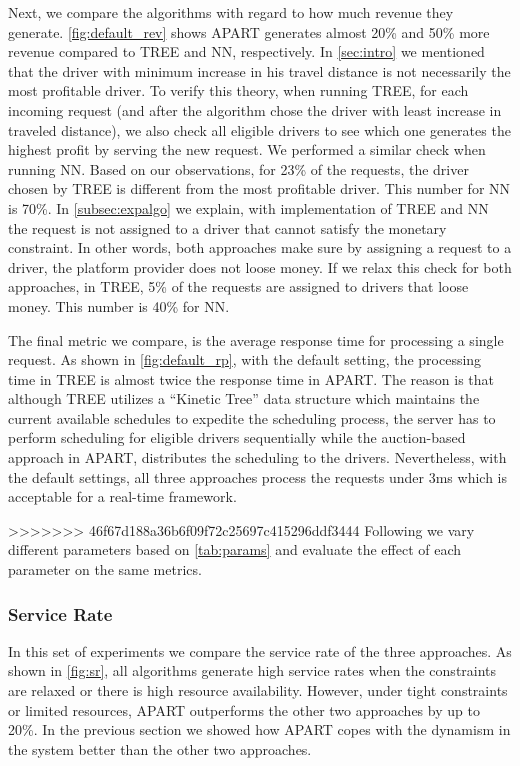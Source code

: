 Next, we compare the algorithms with regard to how much revenue they generate. \cref{fig:default_rev} shows APART generates almost 20\% and 50\% more revenue compared to TREE and NN, respectively. In \cref{sec:intro} we mentioned that the driver with minimum increase in his travel distance is not necessarily the most profitable driver. To verify this theory, when running TREE, for each incoming request (and after the algorithm chose the driver with least increase in traveled distance), we also check all eligible drivers to see which one generates the highest profit by serving the new request. We performed a similar check when running NN. Based on our observations, for 23\% of the requests, the driver chosen by TREE is different from the most profitable driver. This number for NN is 70\%. In \cref{subsec:expalgo} we explain, with implementation of TREE and NN the request is not assigned to a driver that cannot satisfy the monetary constraint. In other words, both approaches make sure by assigning a request to a driver, the platform provider does not loose money. If we relax this check for both approaches, in TREE, 5\% of the requests are assigned to drivers that loose money. This number is 40\% for NN.

The final metric we compare, is the average response time for processing a single request. As shown in \cref{fig:default_rp}, with the default setting, the processing time in TREE is almost twice the response time in APART. The reason is that although TREE utilizes a ``Kinetic Tree'' data structure which maintains the current available schedules to expedite the scheduling process, the server has to perform scheduling for eligible drivers sequentially while the auction-based approach in APART, distributes the scheduling to the drivers. Nevertheless, with the default settings, all three approaches process the requests under 3ms which is acceptable for a real-time framework.

>>>>>>> 46f67d188a36b6f09f72c25697c415296ddf3444
Following we vary different parameters based on \cref{tab:params} and evaluate the effect of each parameter on the same metrics.

\subsubsection{Service Rate}
In this set of experiments we compare the service rate of the three approaches. As shown in \cref{fig:sr}, all algorithms generate high service rates when the constraints are relaxed or there is high resource availability. However, under tight constraints or limited resources, APART outperforms the other two approaches by up to 20\%. In the previous section we showed how APART copes with the dynamism in the system better than the other two approaches.

